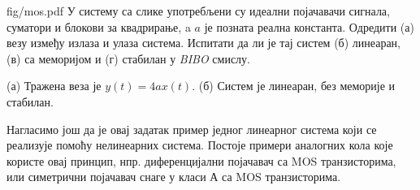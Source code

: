 \begin{slikaDesno}{fig/mos.pdf}
\PID
У систему са слике 
употребљени су идеални појачавачи сигнала, 
суматори и блокови за квадрирање, a $a$ је
позната реална константа. Одредити 
(а) везу између излаза и улаза система. 
Испитати да ли је тај систем (б) линеаран, 
(в) са меморијом и (г) стабилан у \textit{BIBO} смислу.
\end{slikaDesno}

\REZULTAT  (а) Тражена веза је 
$y(t) = 4a x(t)$. (б) Систем је линеаран, без меморије и стабилан.  

Нагласимо још да је овај задатак пример једног линеарног система који се реализује помоћу нелинеарних система. 
Постоје примери аналогних кола које користе овај принцип, нпр. диференцијални појачавач са MOS транзисторима, или 
симетрични појачавач снаге у класи А са MOS транзисторима.